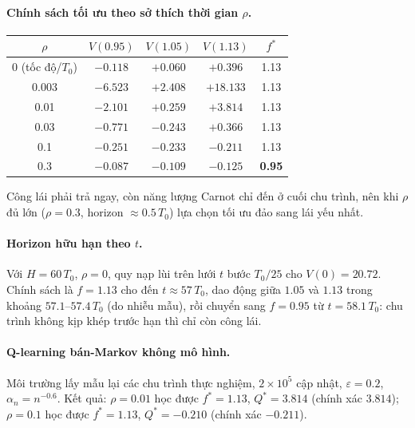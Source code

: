 \documentclass[11pt,a4paper]{article}
\theoremstyle{remark}
\begin{document}
\paragraph{Chính sách tối ưu theo sở thích thời gian $\rho$.}
\begin{center}
\begin{tabular}{ccccc}
\toprule
$\rho$ & $V(0.95)$ & $V(1.05)$ & $V(1.13)$ & $f^*$\\
\midrule
$0$ (tốc độ/$T_0$) & $-0.118$ & $+0.060$ & $+0.396$ & 1.13\\
0.003 & $-6.523$ & $+2.408$ & $+18.133$ & 1.13\\
0.01 & $-2.101$ & $+0.259$ & $+3.814$ & 1.13\\
0.03 & $-0.771$ & $-0.243$ & $+0.366$ & 1.13\\
0.1 & $-0.251$ & $-0.233$ & $-0.211$ & 1.13\\
0.3 & $-0.087$ & $-0.109$ & $-0.125$ & \textbf{0.95}\\
\bottomrule
\end{tabular}
\end{center}
Công lái phải trả ngay, còn năng lượng Carnot chỉ đến ở cuối chu trình, nên khi $\rho$ đủ lớn ($\rho=0.3$, horizon $\approx0.5\,T_0$) lựa chọn tối ưu đảo sang lái yếu nhất.

\paragraph{Horizon hữu hạn theo $t$.} Với $H=60\,T_0$, $\rho=0$, quy nạp lùi trên lưới $t$ bước $T_0/25$ cho $V(0)=20.72$. Chính sách là $f=1.13$ cho đến $t\approx57\,T_0$, dao động giữa $1.05$ và $1.13$ trong khoảng $57.1$--$57.4\,T_0$ (do nhiễu mẫu), rồi chuyển sang $f=0.95$ từ $t=58.1\,T_0$: chu trình không kịp khép trước hạn thì chỉ còn công lái.

\paragraph{Q-learning bán-Markov không mô hình.} Môi trường lấy mẫu lại các chu trình thực nghiệm, $2\times10^5$ cập nhật, $\varepsilon=0.2$, $\alpha_n=n^{-0.6}$. Kết quả: $\rho=0.01$ học được $f^*=1.13$, $Q^*=3.814$ (chính xác $3.814$); $\rho=0.1$ học được $f^*=1.13$, $Q^*=-0.210$ (chính xác $-0.211$).

\end{document}
